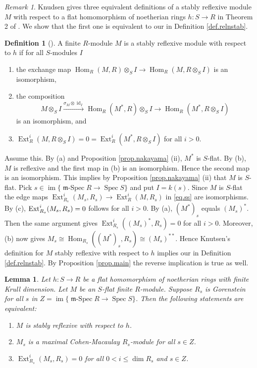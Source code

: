 \documentclass[a4paper,10pt]{amsart}
\theoremstyle{plain}
\newtheorem{lem}[xx]{Lemma}%
\theoremstyle{definition}
\newtheorem*{defn*}{Definition}%
\theoremstyle{remark}
\newtheorem{rem}[xx]{Remark}
\numberwithin{equation}{xx}
\DeclareMathOperator{\Ext}{Ext}
\DeclareMathOperator{\Hom}{Hom}
\DeclareMathOperator{\id}{id}
\DeclareMathOperator{\im}{im}
\DeclareMathOperator{\mSpec}{\fr{m}-Spec}
\DeclareMathOperator{\Spec}{Spec}
\newcommand{\co}{\colon}
\newcommand{\ra}{\rightarrow}
\newcommand{\ot}{{\otimes}}
\renewcommand{\leq}{\leqslant}
\newcommand{\fr}[1]{\mathfrak{{#1}}}
\newcommand{\hm}[4]{{\Hom}_{#2}^{#1}({#3},{#4})}
\newcommand{\xra}[1]{\xrightarrow{{#1}}}
\newcommand{\xt}[4]{{\Ext} _{#2}^{#1}({#3},{#4})}
\begin{document}
\begin{rem}\label{rem.main}
Knudsen gives three equivalent definitions of a stably reflexive module \(M\) with respect to a flat homomorphism of noetherian rings \(h:S\ra R\) in Theorem 2 of \cite[Appendix]{knu:83a}. We show that the first one is equivalent to our in Definition \ref{def.relnstab}.
\begin{defn*}[{\cite[Appendix]{knu:83a}}]
A finite \(R\)-module \(M\) is a stably reflexive module with respect to \(h\) if for all \(S\)-modules \(I\) 
\begin{enumerate}
\item[(a)] 
the exchange map \(\hm{}{R}{M}{R}\ot_{S}I\ra\hm{}{R}{M}{R\ot_{S}I}\) is an isomorphism,
\item[(b)] the composition
\begin{equation*}
M\ot_{S}I\xra{\sigma_{M}\ot\id_{I}}\hm{}{R}{M^{*}}{R}\ot_{S}I\ra\hm{}{R}{M^{*}}{R\ot_{S}I}
\end{equation*}
is an isomorphism, and
\item[(c)] \(\xt{i}{R}{M}{R\ot_{S}I}=0=\xt{i}{R}{M^{*}}{R\ot_{S}I}\) for all \(i>0\).
\end{enumerate}
\end{defn*}
Assume this. By (a) and Proposition \ref{prop.nakayama} (ii), \(M^{*}\) is \(S\)-flat. By (b), \(M\) is reflexive and the first map in (b) is an isomorphism. Hence the second map is an isomorphism. This implies by Proposition \ref{prop.nakayama} (ii) that \(M\) is \(S\)-flat. Pick \(s\in \im\{\mSpec R\ra\Spec S\}\) and put \(I=k(s)\).  Since \(M\) is \(S\)-flat the edge maps \(\xt{i}{R_{s}}{M_{s}}{R_{s}}\ra\xt{i}{R}{M}{R_{s}}\) in \eqref{eq.ss} are isomorphisms. By (c), \(\xt{i}{R_{s}}{M_{s}}{R_{s}}\linebreak[1]=0\) follows for all \(i>0\). By (a), \((M^{*})_{s}\) equals \((M_{s})^{*}\). Then the same argument gives \(\xt{i}{R_{s}}{(M_{s})^{*}}{R_{s}}=0\) for all \(i>0\). Moreover, (b) now gives \(M_{s}\cong\hm{}{R_{s}}{(M^{*})_{s}}{R_{s}}\cong (M_{s})^{**}\). Hence Knutsen's definition for \(M\) stably reflexive with respect to \(h\) implies our in Definition \ref{def.relnstab}. By Proposition \ref{prop.main} the reverse implication is true as well.
\end{rem}
\begin{lem}\label{lem.Gor}
Let \(h\co S\ra R\) be a flat homomorphism of noetherian rings with finite Krull dimension\textup{.} Let \(M\) be an \(S\)-flat finite \(R\)-module\textup{.} Suppose \(R_{s}\) is Gorenstein for all \(s\) in \(Z=\im\{\mSpec R\ra\Spec S\}\)\textup{.} Then the following statements are equivalent\textup{:}
\begin{enumerate}
\item[(i)] \(M\) is stably reflexive with respect to \(h\)\textup{.}
\item[(ii)] \(M_{s}\) is a maximal Cohen-Macaulay \(R_{s}\)-module for all \(s\in Z\)\textup{.}
\item[(iii)] \(\xt{i}{R_{s}}{M_{s}}{R_{s}}=0\) for all \(0<i\leq \dim R_{s}\) and \(s\in Z\)\textup{.}
\end{enumerate}
\end{lem}
\end{document}
